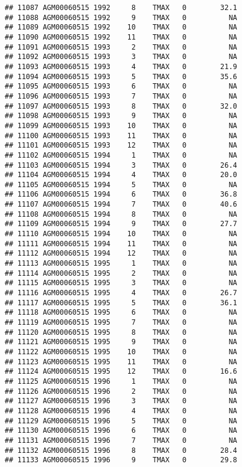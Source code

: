 \documentclass{article}\usepackage[]{graphicx}\usepackage[]{color}
\makeatletter
\newenvironment{kframe}{%
 \def\at@end@of@kframe{}%
 \ifinner\ifhmode%
  \def\at@end@of@kframe{\end{minipage}}%
  \begin{minipage}{\columnwidth}%
 \fi\fi%
 \def\FrameCommand##1{\hskip\@totalleftmargin \hskip-\fboxsep
 \colorbox{shadecolor}{##1}\hskip-\fboxsep
     \hskip-\linewidth \hskip-\@totalleftmargin \hskip\columnwidth}%
 \MakeFramed {\advance\hsize-\width
   \@totalleftmargin\z@ \linewidth\hsize
   \@setminipage}}%
 {\par\unskip\endMakeFramed%
 \at@end@of@kframe}
\newenvironment{knitrout}{}{} %
\makeatother
\begin{document}
\begin{knitrout}
\begin{kframe}
\begin{verbatim}
## 11087 AGM00060515 1992     8    TMAX   0        32.1
## 11088 AGM00060515 1992     9    TMAX   0          NA
## 11089 AGM00060515 1992    10    TMAX   0          NA
## 11090 AGM00060515 1992    11    TMAX   0          NA
## 11091 AGM00060515 1993     2    TMAX   0          NA
## 11092 AGM00060515 1993     3    TMAX   0          NA
## 11093 AGM00060515 1993     4    TMAX   0        21.9
## 11094 AGM00060515 1993     5    TMAX   0        35.6
## 11095 AGM00060515 1993     6    TMAX   0          NA
## 11096 AGM00060515 1993     7    TMAX   0          NA
## 11097 AGM00060515 1993     8    TMAX   0        32.0
## 11098 AGM00060515 1993     9    TMAX   0          NA
## 11099 AGM00060515 1993    10    TMAX   0          NA
## 11100 AGM00060515 1993    11    TMAX   0          NA
## 11101 AGM00060515 1993    12    TMAX   0          NA
## 11102 AGM00060515 1994     1    TMAX   0          NA
## 11103 AGM00060515 1994     3    TMAX   0        26.4
## 11104 AGM00060515 1994     4    TMAX   0        20.0
## 11105 AGM00060515 1994     5    TMAX   0          NA
## 11106 AGM00060515 1994     6    TMAX   0        36.8
## 11107 AGM00060515 1994     7    TMAX   0        40.6
## 11108 AGM00060515 1994     8    TMAX   0          NA
## 11109 AGM00060515 1994     9    TMAX   0        27.7
## 11110 AGM00060515 1994    10    TMAX   0          NA
## 11111 AGM00060515 1994    11    TMAX   0          NA
## 11112 AGM00060515 1994    12    TMAX   0          NA
## 11113 AGM00060515 1995     1    TMAX   0          NA
## 11114 AGM00060515 1995     2    TMAX   0          NA
## 11115 AGM00060515 1995     3    TMAX   0          NA
## 11116 AGM00060515 1995     4    TMAX   0        26.7
## 11117 AGM00060515 1995     5    TMAX   0        36.1
## 11118 AGM00060515 1995     6    TMAX   0          NA
## 11119 AGM00060515 1995     7    TMAX   0          NA
## 11120 AGM00060515 1995     8    TMAX   0          NA
## 11121 AGM00060515 1995     9    TMAX   0          NA
## 11122 AGM00060515 1995    10    TMAX   0          NA
## 11123 AGM00060515 1995    11    TMAX   0          NA
## 11124 AGM00060515 1995    12    TMAX   0        16.6
## 11125 AGM00060515 1996     1    TMAX   0          NA
## 11126 AGM00060515 1996     2    TMAX   0          NA
## 11127 AGM00060515 1996     3    TMAX   0          NA
## 11128 AGM00060515 1996     4    TMAX   0          NA
## 11129 AGM00060515 1996     5    TMAX   0          NA
## 11130 AGM00060515 1996     6    TMAX   0          NA
## 11131 AGM00060515 1996     7    TMAX   0          NA
## 11132 AGM00060515 1996     8    TMAX   0        28.4
## 11133 AGM00060515 1996     9    TMAX   0        29.8

\end{verbatim}
\end{kframe}
\end{knitrout}
\end{document}
